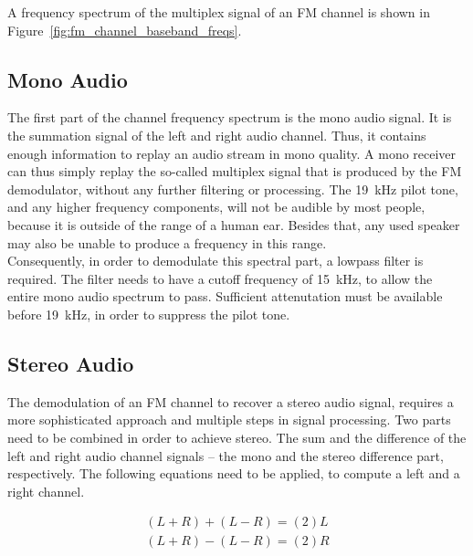 \noindent
A frequency spectrum of the multiplex signal of an FM channel is shown in Figure~\ref{fig:fm_channel_baseband_freqs}.

\subsection{Mono Audio}
\label{subsec:demod_mono}

The first part of the channel frequency spectrum is the mono audio signal.
It is the summation signal of the left and right audio channel.
Thus, it contains enough information to replay an audio stream in mono quality.
A mono receiver can thus simply replay the so-called multiplex signal that is produced by the FM demodulator, without any further filtering or processing.
The 19~kHz pilot tone, and any higher frequency components, will not be audible by most people, because it is outside of the range of a human ear.
Besides that, any used speaker may also be unable to produce a frequency in this range.\\

Consequently, in order to demodulate this spectral part, a lowpass filter is required.
The filter needs to have a cutoff frequency of 15~kHz, to allow the entire mono audio spectrum to pass.
Sufficient attenutation must be available before 19~kHz, in order to suppress the pilot tone.

\subsection{Stereo Audio}
\label{subsec:demod_stereo_audio}

The demodulation of an FM channel to recover a stereo audio signal, requires a more sophisticated approach and multiple steps in signal processing.
Two parts need to be combined in order to achieve stereo.
The sum and the difference of the left and right audio channel signals -- the mono and the stereo difference part, respectively.
The following equations need to be applied, to compute a left and a right channel.

\begin{equation}
  \begin{split}
    (L+R) + (L-R) = (2)L \\
    (L+R) - (L-R) = (2)R
    \label{equ_stereo_from_sum_diff}
  \end{split}
\end{equation}

